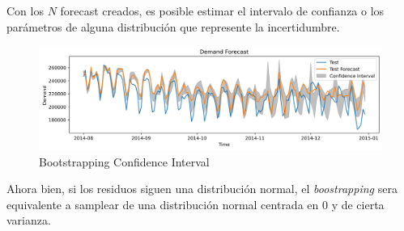 Con los $N$ forecast creados, es posible estimar el intervalo de confianza o los parámetros de alguna distribución que represente la incertidumbre.

\begin{figure}[H]
    \center
    \includegraphics[scale=0.5]{notebooks/TS/img/demand_ml_forecasting.png}
    \caption{Bootstrapping Confidence Interval}
\end{figure}

Ahora bien, si los residuos siguen una distribución normal, el \textit{boostrapping} sera equivalente a samplear de una distribución normal centrada en 0 y de cierta varianza.

